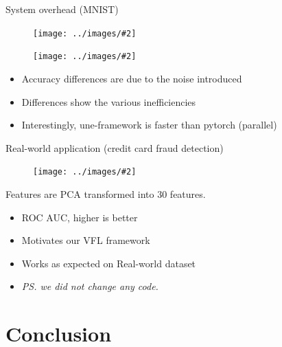 \documentclass[xcolor=dvipsnames]{beamer}
\newcommand{\rimg}[2] {
  \begin{figure}
    \centering
    \texttt{[image: ../images/\#2]}
  \end{figure}
}
\begin{document}
\begin{frame}{System overhead (MNIST)}
    \begin{minipage}{.5\textwidth}
      \centering
      \rimg{0.45}{mnist_accuracy.pdf}
    \end{minipage}%
    \begin{minipage}{.5\textwidth}
      \centering
      \rimg{0.45}{mnist_time.pdf}
    \end{minipage}
    \begin{itemize}
      \item Accuracy differences are due to the noise introduced
      \item Differences show the various inefficiencies
      \item Interestingly, une-framework is faster than pytorch (parallel)
    \end{itemize}
\end{frame}

\begin{frame}{Real-world application (credit card fraud detection)}
  \begin{minipage}{.6\textwidth}
    \centering
    \rimg{0.5}{ccfraud_roc_auc_score.pdf}
  \end{minipage}%
  \begin{minipage}{.4\textwidth}
    Features are PCA transformed into $30$ features.
    \begin{itemize}
      \item ROC AUC, higher is better
      \item Motivates our VFL framework
      \item Works as expected on Real-world dataset
      \item \emph{PS. we did not change any code.}
    \end{itemize}
  \end{minipage}
  
\end{frame}

\section{Conclusion}
\end{document}
